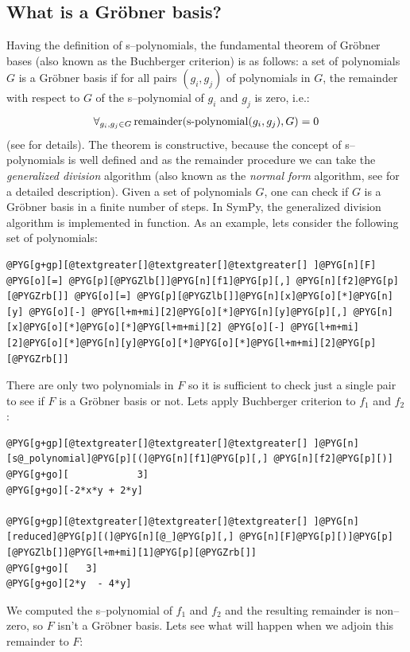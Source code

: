 \subsection{What is a Gröbner basis?}

Having the definition of s--polynomials, the fundamental theorem of Gröbner bases (also known as
the Buchberger criterion) is as follows: a set of polynomials $G$ is a Gröbner basis if for all
pairs $(g_i, g_j)$ of polynomials in $G$, the remainder with respect to $G$ of the s--polynomial
of $g_i$ and $g_j$ is zero, i.e.:
\begin{gather}
\begin{split}\forall_{g_i, g_j \in G} \operatorname{remainder}(\operatorname{s-polynomial}(g_i, g_j), G) = 0\end{split}\notag
\end{gather}
(see \cite{Adams1994intro} for details). The theorem is constructive, because the concept of
s--polynomials is well defined and as the remainder procedure we can take the \emph{generalized
division} algorithm (also known as the \emph{normal form} algorithm, see \cite{Cox1997ideals} for a
detailed description). Given a set of polynomials $G$, one can check if $G$ is a Gröbner
basis in a finite number of steps. In SymPy, the generalized division algorithm is implemented
in  function. As an example, lets consider the following set of polynomials:

\begin{Verbatim}[commandchars=@\[\]]
@PYG[g+gp][@textgreater[]@textgreater[]@textgreater[] ]@PYG[n][F] @PYG[o][=] @PYG[p][@PYGZlb[]]@PYG[n][f1]@PYG[p][,] @PYG[n][f2]@PYG[p][@PYGZrb[]] @PYG[o][=] @PYG[p][@PYGZlb[]]@PYG[n][x]@PYG[o][*]@PYG[n][y] @PYG[o][-] @PYG[l+m+mi][2]@PYG[o][*]@PYG[n][y]@PYG[p][,] @PYG[n][x]@PYG[o][*]@PYG[o][*]@PYG[l+m+mi][2] @PYG[o][-] @PYG[l+m+mi][2]@PYG[o][*]@PYG[n][y]@PYG[o][*]@PYG[o][*]@PYG[l+m+mi][2]@PYG[p][@PYGZrb[]]
\end{Verbatim}
\noindent
There are only two polynomials in $F$ so it is sufficient to check just a single pair to see
if $F$ is a Gröbner basis or not. Lets apply Buchberger criterion to $f_1$ and $f_2$:

\begin{Verbatim}[commandchars=@\[\]]
@PYG[g+gp][@textgreater[]@textgreater[]@textgreater[] ]@PYG[n][s@_polynomial]@PYG[p][(]@PYG[n][f1]@PYG[p][,] @PYG[n][f2]@PYG[p][)]
@PYG[g+go][            3]
@PYG[g+go][-2*x*y + 2*y]

@PYG[g+gp][@textgreater[]@textgreater[]@textgreater[] ]@PYG[n][reduced]@PYG[p][(]@PYG[n][@_]@PYG[p][,] @PYG[n][F]@PYG[p][)]@PYG[p][@PYGZlb[]]@PYG[l+m+mi][1]@PYG[p][@PYGZrb[]]
@PYG[g+go][   3]
@PYG[g+go][2*y  - 4*y]
\end{Verbatim}
\noindent
We computed the s--polynomial of $f_1$ and $f_2$ and the resulting remainder is non--zero, so
$F$ isn't a Gröbner basis. Lets see what will happen when we adjoin this remainder to $F$:

